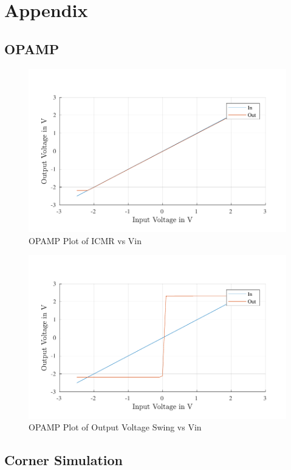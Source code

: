 \chapter{Appendix}
\section{OPAMP}
\begin{figure} [H]
\centering
\includegraphics[scale=1]{Figures/Plots/OPAMP_ICMR.pdf}
\caption{OPAMP Plot of ICMR vs Vin}
\label{fig:OPAMP_ICMR}
\end{figure}


\begin{figure} [H]
\centering
\includegraphics[scale=1]{Figures/Plots/OPAMP_OutSwing.pdf}
\caption{OPAMP Plot of Output Voltage Swing vs Vin}
\label{fig:OPAMP_Swing}
\end{figure}

\section{Corner Simulation}

